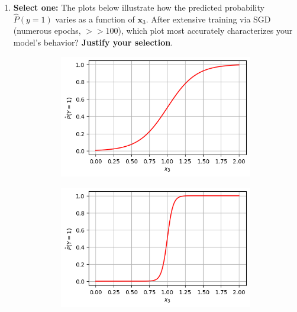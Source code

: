 \documentclass[11pt,addpoints,answers]{exam}
\newcommand{\xv}{\mathbf{x}}
\newcommand{\sone}{\textbf{Select one: }}
\begin{document}
\begin{enumerate}
\begin{enumerate}[label=\alph*), itemsep=10pt]
			\begin{enumerate}[label=(\roman*), leftmargin=*]
				
				\item \sone
				The plots below illustrate how the predicted probability $\hat{P}(y=1)$ varies as a function of $\xv_3$. After extensive training via SGD (numerous epochs, $>>100$), which plot most accurately characterizes your model's behavior? \textbf{Justify your selection}.
				
				\begin{figure}[h]
					\centering
					\begin{subfigure}[t]{0.42\textwidth}
						\centering
						\includegraphics[width=\textwidth]{fig/Plot A.png}
						\caption{}
					\end{subfigure}
					\hfill
					\begin{subfigure}[t]{0.42\textwidth}
						\centering
						\includegraphics[width=\textwidth]{fig/Plot B.png}
						\caption{}
					\end{subfigure}
				\end{figure}
				

\end{enumerate}
\end{enumerate}
\end{enumerate}
\end{document}
